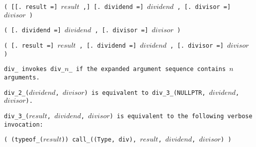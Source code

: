 
\s\s\s\tt{(} [[\tt{. result =}] $result$ \tt{,}]
[\tt{. dividend =}] $dividend$ \tt{,} [\tt{. divisor =}] $divisor$ \tt{)}

\s\tt{(} \phantom{[}[\tt{. dividend =}]
$dividend$ \tt{,} [\tt{. divisor =}] $divisor$ \tt{)}

\s\tt{(} \phantom{[}[\tt{. result =}] $result$ \tt{,}\phantom{]}
[\tt{. dividend =}] $dividend$ \tt{,} [\tt{. divisor =}] $divisor$ \tt{)}


\tt{div_} invokes \tt{div_}$n$\_ if the
expanded argument sequence contains $n$ arguments.

\tt{div_2_(}$dividend$\tt{,} $divisor$\tt{)} is equivalent to
\tt{div_3_(NULLPTR,} $dividend$\tt{,} $divisor$\tt{)}.

\tt{div_3_(}$result$\tt{,} $dividend$\tt{,} $divisor$\tt{)}
is equivalent to the following verbose invocation:

\enlargethispage*{\baselineskip}
\begin{center}
\tt{( (typeof_(}$result$\tt{)) call_((Type, div),}
$result$\tt{,} $dividend$\tt{,} $divisor$\tt{) )}
\end{center}
